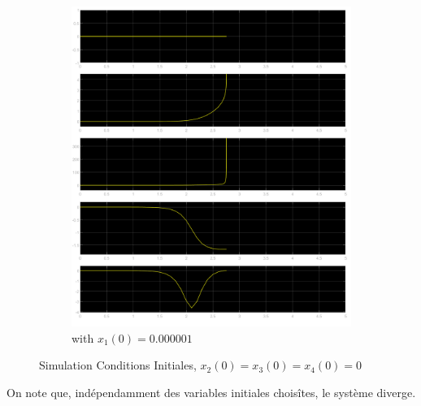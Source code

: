 \documentclass[class=article, crop=false]{standalone}
\begin{document}
\begin{resolution}
\begin{figure}[H]
\begin{subfigure}[b]{0.475\textwidth}
            \includegraphics[width=\textwidth]{../images/simulink_scope2_0_000001.png}
            \caption{with $x_1(0) = 0.000001$}
        \end{subfigure}
        \caption{Simulation Conditions Initiales, $x_2(0) = x_3(0) = x_4(0) = 0$}
        \label{fig:simulink_simulation_conditions_initiales}
    \end{figure}
    On note que, indépendamment des variables initiales choisîtes, le système diverge.
\end{resolution}

\newpage
\end{document}
